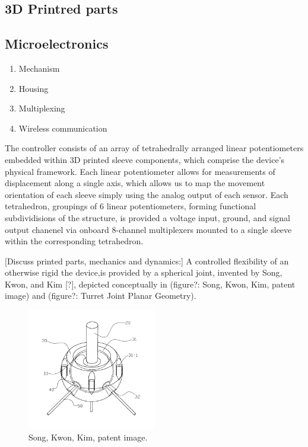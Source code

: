 \documentclass[11pt]{article}
\begin{document}
\subsection{3D Printred parts}
\subsection{Microelectronics}
 \begin{enumerate}
 \item Mechanism
 \item Housing
 \item Multiplexing
 \item Wireless communication
 \end{enumerate}

 The controller consists of an array of tetrahedrally arranged linear potentiometers embedded within 3D printed sleeve components, which comprise the device's physical framework. Each linear potentiometer allows for measurements of displacement along a single axis, which allows us to map the movement orientation of each sleeve simply using the analog output of each sensor. Each tetrahedron, groupings of 6 linear potentiometers, forming functional subdividisions of the structure, is provided a voltage input, ground, and signal output chanenel via onboard 8-channel multiplexers mounted to a single sleeve within the corresponding tetrahedron.

 [Discuss printed parts, mechanics and dynamics:]
 A controlled flexibility of an otherwise rigid the device,is provided by a spherical joint, invented by Song, Kwon, and Kim [?], depicted conceptually in (figure?: Song, Kwon, Kim, patent image) and (figure?: Turret Joint Planar Geometry).

\begin{figure}[H]
  \centering
    \includegraphics[width=0.5\textwidth]{figures/SongKwonKimImage.png}
    \caption[Song, Kwon, Kim, patent image.]{Song, Kwon, Kim, patent image.}
      \label{SongKwonKimImage}
\end{figure}
\end{document}
